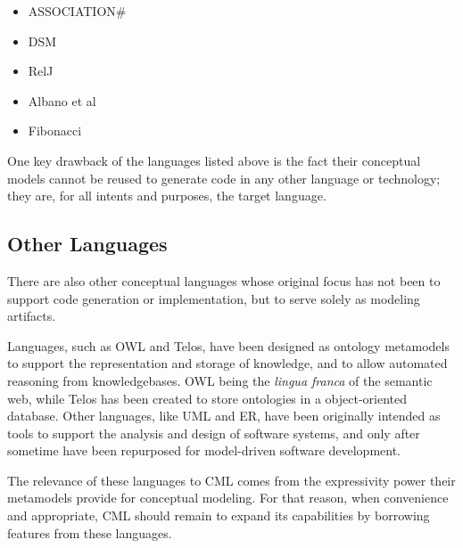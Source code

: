 \begin{itemize}
\item ASSOCIATION\#
\item DSM
\item RelJ
\item Albano et al
\item Fibonacci
\end{itemize}

One key drawback of the languages listed above is the fact their conceptual models
cannot be reused to generate code in any other language or technology;
they are, for all intents and purposes, the target language.

\subsection{Other Languages}

There are also other conceptual languages whose original focus has not been to support code generation or implementation,
but to serve solely as modeling artifacts.

Languages, such as OWL and Telos, have been designed as ontology metamodels
to support the representation and storage of knowledge,
and to allow automated reasoning from knowledgebases.
OWL being the \emph{lingua franca} of the semantic web,
while Telos has been created to store ontologies in a object-oriented database.
Other languages, like UML and ER, have been originally intended as tools to support the analysis and design of software systems, and only after sometime have been repurposed for model-driven software development.

The relevance of these languages to CML comes from the expressivity power their metamodels provide for conceptual modeling. For that reason, when convenience and appropriate, CML should remain to expand its capabilities by borrowing features from these languages.
